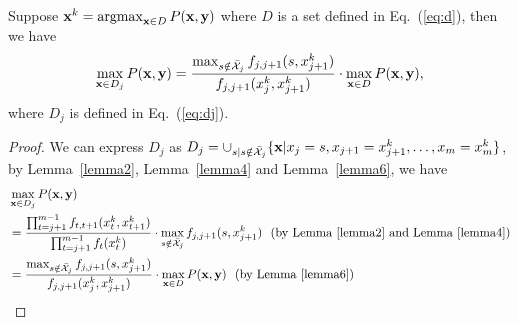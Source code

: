 \begin{theorem}
\label{theorem4}
Suppose $\mathbf{x}^k = \operatorname*{argmax}_{\mathbf{x} \in D} P(\mathbf{x},\mathbf{y})$ where $D$ is a set defined in Eq.~(\ref{eq:d}), %
then we have
\begin{equation*}
\max_{\mathbf{x} \in D_j} P(\mathbf{x},\mathbf{y}) 
= \frac{\max_{s \notin \bar{\mathcal{X}}_j} f_{j,j+1}(s, x_{j+1}^k)} {f_{j,j+1}(x_j^k,x_{j+1}^k)}
  \cdot \max_{\mathbf{x} \in D} P(\mathbf{x},\mathbf{y}),
\end{equation*}
where $D_j$ is defined in Eq.~(\ref{eq:dj}).  %
\end{theorem}

\begin{proof}
We can express $D_j$ as 
$D_j = \cup_{s |s \notin \bar{\mathcal{X}}_j} \{\mathbf{x} |x_j = s, x_{j+1} = x_{j+1}^k, \dots, x_m = x_m^k\}$,
by Lemma~\ref{lemma2}, Lemma~\ref{lemma4} and Lemma~\ref{lemma6}, we have
\begin{align*}
&\max_{\mathbf{x} \in D_j} P(\mathbf{x},\mathbf{y}) \\
&= \frac{\prod_{t=j+1}^{m-1} f_{t,t+1}(x_t^k,x_{t+1}^k)} {\prod_{t=j+1}^{m-1} f_t(x_t^k)}
   \cdot \max_{s \notin \bar{\mathcal{X}}_j} f_{j,j+1}(s, x_{j+1}^k)
~~\text{(by Lemma~\ref{lemma2} and Lemma~\ref{lemma4})} \\
&= \frac{\max_{s \notin \bar{\mathcal{X}}_j} f_{j,j+1}(s, x_{j+1}^k)} {f_{j,j+1}(x_j^k,x_{j+1}^k)}
   \cdot \max_{\mathbf{x} \in D} P(\mathbf{x},\mathbf{y})
~~\text{(by Lemma~\ref{lemma6})}
\end{align*}
\end{proof}
